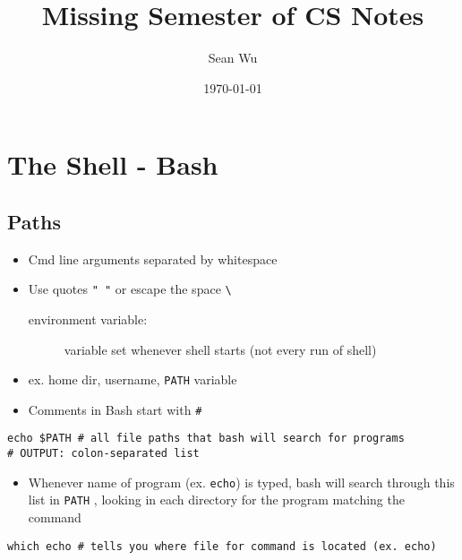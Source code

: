 \documentclass[letterpaper,12pt]{article}
\begin{document}
\title{Missing Semester of CS Notes}
\author{Sean Wu}
\date{\today}
\maketitle

\tableofcontents

\pagebreak

\setlength{\parindent}{0em}
\setlength{\parskip}{1em}

\section{The Shell - Bash}

\subsection{Paths}

\begin{itemize}
 \item Cmd line arguments separated by whitespace
 \item Use quotes \lstinline{" "} or escape the space \lstinline{\ }

       \begin{description}
        \item[environment variable:] variable set whenever shell starts (not every run of shell)
       \end{description}

 \item ex. home dir, username, \lstinline{PATH} variable
 \item Comments in Bash start with \lstinline{#}
\end{itemize}

\begin{lstlisting}
echo $PATH # all file paths that bash will search for programs
# OUTPUT: colon-separated list
\end{lstlisting}

\begin{itemize}
 \item Whenever name of program (ex. \lstinline{echo}) is typed, bash will search through this list in \lstinline{PATH} , looking in each directory for the program matching the command
\end{itemize}

\begin{lstlisting}
which echo # tells you where file for command is located (ex. echo)
\end{lstlisting}
\end{document}
